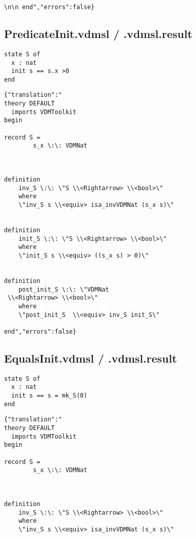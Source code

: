 \begin{appendices}
\begin{lstlisting}
\n\n end","errors":false}
\end{lstlisting}

\subsection{PredicateInit.vdmsl / .vdmsl.result}
\begin{lstlisting}
state S of
  x : nat
  init s == s.x >0
end
\end{lstlisting}

\begin{lstlisting}
{"translation":"
theory DEFAULT
  imports VDMToolkit
begin

record S =
        s_x \:\: VDMNat

    

definition
    inv_S \:\: \"S \\<Rightarrow> \\<bool>\"
    where
    \"inv_S s \\<equiv> isa_invVDMNat (s_x s)\"


definition
    init_S \:\: \"S \\<Rightarrow> \\<bool>\"
    where
    \"init_S s \\<equiv> ((s_x s) > 0)\"


definition
    post_init_S \:\: \"VDMNat
 \\<Rightarrow> \\<bool>\"
    where
    \"post_init_S  \\<equiv> inv_S init_S\"

end","errors":false}
\end{lstlisting}

\subsection{EqualsInit.vdmsl / .vdmsl.result}
\begin{lstlisting}
state S of
  x : nat
  init s == s = mk_S(0)
end
\end{lstlisting}

\begin{lstlisting}
{"translation":"
theory DEFAULT
  imports VDMToolkit
begin

record S =
        s_x \:\: VDMNat

    

definition
    inv_S \:\: \"S \\<Rightarrow> \\<bool>\"
    where
    \"inv_S s \\<equiv> isa_invVDMNat (s_x s)\"



\end{lstlisting}
\end{appendices}
